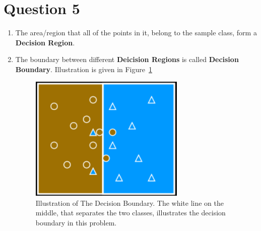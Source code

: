 \documentclass[a4paper,12pt]{article}
\begin{document}
\section*{Question 5}
\begin{enumerate}[label=(\alph*)]
    \item The area/region that all of the points in it, belong to the sample class, form a \textbf{Decision Region}.
    \item The boundary between different \textbf{Deicision Regions} is called \textbf{Decision Boundary}. Illustration is given in Figure~\ref{fig:fig_1}
    \begin{figure}[H]
        \centering
        \includegraphics[width=0.7\textwidth]{../images/decision_boundary.png}
        \caption{Illustration of The Decision Boundary. The white line on the middle, that separates the two classes, illustrates the decision boundary in this problem.}
        \label{fig:fig_1}
    \end{figure}
\end{enumerate}
\end{document}
